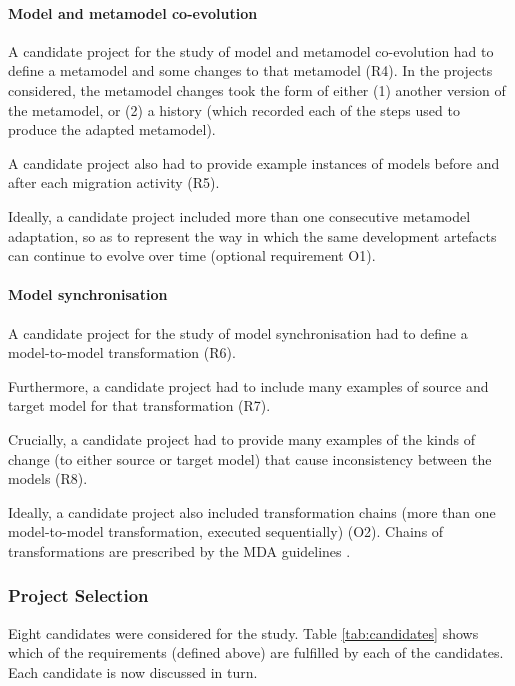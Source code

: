 \paragraph{Model and metamodel co-evolution}
A candidate project for the study of model and metamodel co-evolution had to define a metamodel and some changes to that metamodel (R4). In the projects considered, the metamodel changes took the form of either (1) another version of the metamodel, or (2) a history (which recorded each of the steps used to produce the adapted metamodel).

A candidate project also had to provide example instances of models before and after each migration activity (R5).

Ideally, a candidate project included more than one consecutive metamodel adaptation, so as to represent the way in which the same development artefacts can continue to evolve over time (optional requirement O1).

\paragraph{Model synchronisation}
A candidate project for the study of model synchronisation had to define a model-to-model transformation (R6).

Furthermore, a candidate project had to include many examples of source and target model for that transformation (R7).

Crucially, a candidate project had to provide many examples of the kinds of change (to either source or target model) that cause inconsistency between the models (R8). 

Ideally, a candidate project also included transformation chains (more than one model-to-model transformation, executed sequentially) (O2). Chains of transformations are prescribed by the MDA guidelines \cite{kleppe03mda}.


\subsubsection{Project Selection} %
\label{ssub:project_selection}
Eight candidates were considered for the study. Table \ref{tab:candidates} shows which of the requirements (defined above) are fulfilled by each of the candidates. Each candidate is now discussed in turn.

